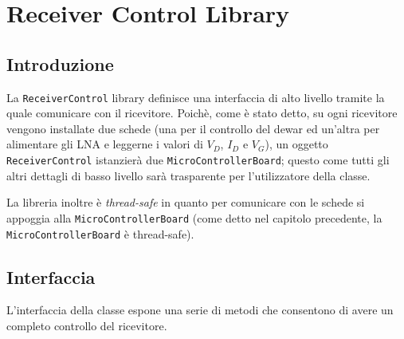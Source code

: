 \chapter{Receiver Control Library}

\section{Introduzione}
La \texttt{ReceiverControl} library definisce una interfaccia di alto livello
tramite la quale comunicare con il ricevitore. Poich\`e, come \`e stato detto, su ogni ricevitore
vengono installate due schede (una per il controllo del dewar ed un'altra
per alimentare gli LNA e leggerne i valori di $V_D$, $I_D$ e $V_G$), un oggetto \texttt{ReceiverControl}
istanzier\`a due \texttt{MicroControllerBoard}; questo come tutti gli altri dettagli di basso livello
sar\`a trasparente per l'utilizzatore della classe.

La libreria inoltre \`e \emph{thread-safe} in quanto per comunicare con 
le schede si appoggia alla \texttt{MicroControllerBoard}
(come detto nel capitolo precedente, la \texttt{MicroControllerBoard} \`e thread-safe).


\section{Interfaccia}
L'interfaccia della classe espone una serie di metodi che consentono di avere un completo controllo
del ricevitore. 

